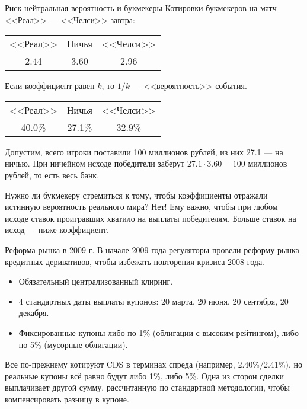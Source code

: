 \documentclass{beamer}
\begin{document}
\begin{frame}{Риск-нейтральная вероятность и букмекеры}
\justify
Котировки букмекеров на матч <<Реал>> --- <<Челси>> завтра:

\centering
\begin{tabular}{c|c|c}
<<Реал>> & Ничья & <<Челси>> \\
2.44 & 3.60 & 2.96
\end{tabular}

\justify
Если коэффициент равен $k$, то $1/k$ --- <<вероятность>> события.

\centering
\begin{tabular}{c|c|c}
<<Реал>> & Ничья & <<Челси>> \\
40.0\% & 27.1\% & 32.9\%
\end{tabular}

\justify
Допустим, всего игроки поставили 100 миллионов рублей, из них 27.1 --- на ничью. При 
ничейном исходе победители заберут $27.1 \cdot 3.60 = 100$ миллионов рублей, то 
есть весь банк.

\justify
Нужно ли букмекеру стремиться к тому, чтобы коэффициенты отражали истинную вероятность реального мира? Нет! Ему важно, чтобы при любом исходе ставок проигравших хватило на выплаты победителям. Больше ставок на исход --- ниже коэффициент.
\end{frame}



\begin{frame}{Реформа рынка в 2009 г.}
\justify
В начале 2009 года регуляторы провели реформу рынка кредитных деривативов, чтобы избежать повторения кризиса 2008 года.

\begin{itemize}
\justifying
\item Обязательный централизованный клиринг.
\item 4 стандартных даты выплаты купонов: 20 марта, 20 июня, 20 сентября, 20 декабря.
\item Фиксированные купоны либо по 1\% (облигации с высоким рейтингом), либо по 5\% (мусорные облигации).
\end{itemize}

\justify
Все по-прежнему котируют CDS в терминах спреда (например, 2.40\%/2.41\%), но реальные купоны всё равно будут либо 1\%, либо 5\%. Одна из сторон сделки выплачивает другой сумму, рассчитанную по стандартной методологии, чтобы компенсировать разницу в купоне.
\end{frame}
\end{document}
